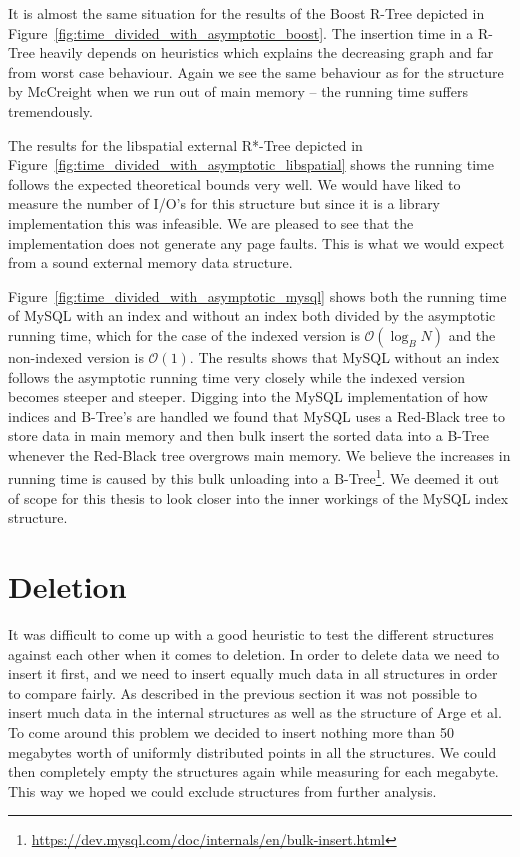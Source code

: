\documentclass[twoside,11pt,openright]{report}
\begin{document}
It is almost the same situation for the results of the Boost R-Tree depicted in Figure~\ref{fig:time_divided_with_asymptotic_boost}. The insertion time in a R-Tree heavily depends on heuristics which explains the decreasing graph and far from worst case behaviour. Again we see the same behaviour as for the structure by McCreight when we run out of main memory -- the running time suffers tremendously.

The results for the libspatial external R*-Tree depicted in Figure~\ref{fig:time_divided_with_asymptotic_libspatial} shows the running time follows the expected theoretical bounds very well. We would have liked to measure the number of I/O's for this structure but since it is a library implementation this was infeasible. We are pleased to see that the implementation does not generate any page faults. This is what we would expect from a sound external memory data structure.

Figure~\ref{fig:time_divided_with_asymptotic_mysql} shows both the running time of MySQL with an index and without an index both divided by the asymptotic running time, which for the case of the indexed version is $\mathcal{O}(\log_B N)$ and the non-indexed version is $\mathcal{O}(1)$. The results shows that MySQL without an index follows the asymptotic running time very closely while the indexed version becomes steeper and steeper. Digging into the MySQL implementation of how indices and B-Tree's are handled we found that MySQL uses a Red-Black tree to store data in main memory and then bulk insert the sorted data into a B-Tree whenever the Red-Black tree overgrows main memory. We believe the increases in running time is caused by this bulk unloading into a B-Tree\footnote{\url{https://dev.mysql.com/doc/internals/en/bulk-insert.html}}. We deemed it out of scope for this thesis to look closer into the inner workings of the MySQL index structure.

\clearpage

\section{Deletion}
It was difficult to come up with a good heuristic to test the different structures against each other when it comes to deletion. In order to delete data we need to insert it first, and we need to insert equally much data in all structures in order to compare fairly. As described in the previous section it was not possible to insert much data in the internal structures as well as the structure of Arge et al. To come around this problem we decided to insert nothing more than 50 megabytes worth of uniformly distributed points in all the structures. We could then completely empty the structures again while measuring for each megabyte. This way we hoped we could exclude structures from further analysis.
\end{document}
